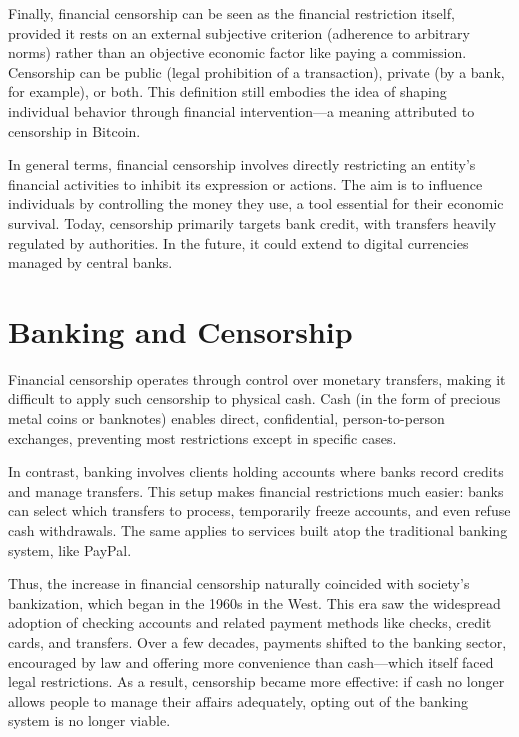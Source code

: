 \documentclass[
  a5paper,
  smalldemyvopaper,10pt,twoside,onecolumn,openright,extrafontsizes,hidelinks]{memoir}
\begin{document}
Finally, financial censorship can be seen as the financial restriction
itself, provided it rests on an external subjective criterion (adherence
to arbitrary norms) rather than an objective economic factor like paying
a commission. Censorship can be public (legal prohibition of a
transaction), private (by a bank, for example), or both. This definition
still embodies the idea of shaping individual behavior through financial
intervention---a meaning attributed to censorship in Bitcoin.

In general terms, financial censorship involves directly restricting an
entity's financial activities to inhibit its expression or actions. The
aim is to influence individuals by controlling the money they use, a
tool essential for their economic survival. Today, censorship primarily
targets bank credit, with transfers heavily regulated by authorities. In
the future, it could extend to digital currencies managed by central
banks.

\section*{Banking and Censorship}\label{la-banque-et-la-censure}


Financial censorship operates through control over monetary transfers,
making it difficult to apply such censorship to physical cash. Cash (in
the form of precious metal coins or banknotes) enables direct,
confidential, person-to-person exchanges, preventing most restrictions
except in specific cases.

In contrast, banking involves clients holding accounts where banks
record credits and manage transfers. This setup makes financial
restrictions much easier: banks can select which transfers to process,
temporarily freeze accounts, and even refuse cash withdrawals. The same
applies to services built atop the traditional banking system, like
PayPal.

Thus, the increase in financial censorship naturally coincided with
society's bankization, which began in the 1960s in the West. This era
saw the widespread adoption of checking accounts and related payment
methods like checks, credit cards, and transfers. Over a few decades,
payments shifted to the banking sector, encouraged by law and offering
more convenience than cash---which itself faced legal restrictions. As a
result, censorship became more effective: if cash no longer allows
people to manage their affairs adequately, opting out of the banking
system is no longer viable.
\end{document}
